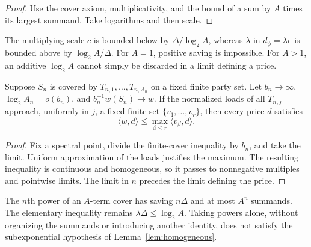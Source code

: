 \begin{proof}
Use the cover axiom, multiplicativity, and the bound of a sum by
$A$ times its largest summand. Take logarithms and then scale.
\end{proof}

The multiplying scale $c$ is bounded below by $\Delta/\log_2A$,
whereas $\lambda$ in $d_\phi=\lambda e$ is bounded above by
$\log_2A/\Delta$. For $A=1$, positive saving is impossible.
For $A>1$, an additive $\log_2A$ cannot simply be discarded in a
limit defining a price.

\begin{lemma}\label{lem:homogeneous}
Suppose $S_n$ is covered by $T_{n,1},\ldots,T_{n,A_n}$ on a fixed
finite party set. Let $b_n\to\infty$, $\log_2A_n=o(b_n)$, and
$b_n^{-1}w(S_n)\to w$.
If the normalized loads of all $T_{n,j}$ approach, uniformly in
$j$, a fixed finite set $\{v_1,\ldots,v_r\}$, then every price $d$
satisfies
\[
 \langle w,d\rangle\le\max_{\beta\le r}\langle v_\beta,d\rangle.
\]
\end{lemma}

\begin{proof}
Fix a spectral point, divide the finite-cover inequality by $b_n$,
and take the limit. Uniform approximation of the loads justifies
the maximum. The resulting inequality is continuous and homogeneous,
so it passes to nonnegative multiples and pointwise limits.
The limit in $n$ precedes the limit defining the price.
\end{proof}

\begin{example}\label{ex:tensor-power-selector}
The $n$th power of an $A$-term cover has saving $n\Delta$ and at
most $A^n$ summands. The elementary inequality remains
$\lambda\Delta\le\log_2A$. Taking powers alone, without organizing
the summands or introducing another identity, does not satisfy
the subexponential hypothesis of Lemma~\ref{lem:homogeneous}.
\end{example}
